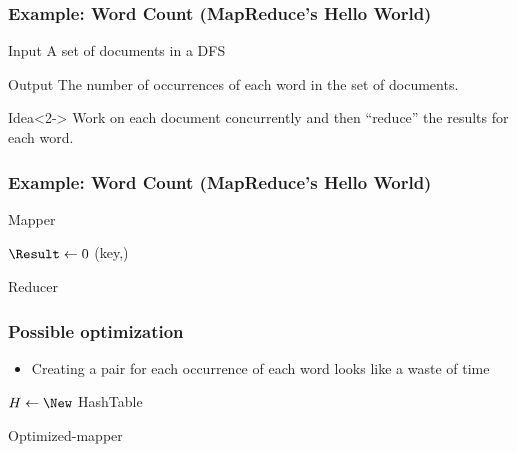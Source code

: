 \begin{frame}
\frametitle{Example: Word Count (MapReduce's Hello World)}
  \begin{block}{Input}
  A set of documents in a DFS
  \end{block}
  \begin{block}{Output}
  The number of occurrences of each word in the set of documents.
  \end{block}

  \begin{block}{Idea}<2->
  Work on each document concurrently and then ``reduce'' the results for each word.
  \end{block}

\end{frame}


\begin{frame}[fragile]
\frametitle{Example: Word Count (MapReduce's Hello World)}

\begin{algorithm}[H]
\caption{Mapper}
\end{algorithm}

\vspace{-1em}
\begin{algorithm}[H]
$\Result \leftarrow 0$\;
\Emit(key,\Result)\;
\caption{Reducer}
\end{algorithm}
\end{frame}

\begin{frame} 
\frametitle{Possible optimization}
\begin{itemize}
  \item Creating a pair for each occurrence of each word looks like a waste of time
\end{itemize}

\begin{algorithm}[H]
$H \leftarrow \New$ HashTable\;

\caption{Optimized-mapper}
\end{algorithm}
\end{frame}

